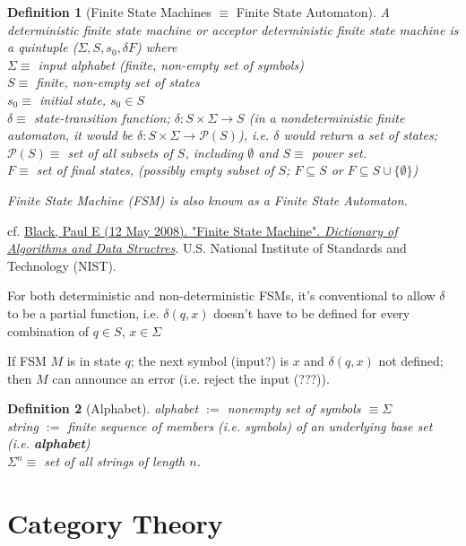 \documentclass[10pt]{amsart}
\newtheorem{definition}{Definition}
\begin{document}
\begin{multicols*}{2}
\begin{definition}[Finite State Machines $\equiv$ Finite State Automaton]
	A deterministic finite state machine or acceptor deterministic finite state machine is a quintuple ($\Sigma, S, s_0, \delta F$) where \\
	$\Sigma \equiv $ input alphabet (finite, non-empty set of symbols) \\
 	$S \equiv $ finite, non-empty set of states \\
 	$s_0 \equiv $ initial state, $s_0 \in S$ \\
 	$\delta \equiv $ state-transition function; $\delta : S \times \Sigma \to S$ (in a nondeterministic finite automaton, it would be $\delta : S \times \Sigma \to \mathcal{P}(S)$), i.e. $\delta$ would return a set of states; $\mathcal{P}(S) \equiv $ set of all subsets of $S$, including $\emptyset$ and $S \equiv$ power set. \\
 	$F \equiv $ set of final states, (possibly empty subset of $S$; $F\subseteq S$ or $F \subseteq S \cup \lbrace \emptyset \rbrace$)

	Finite State Machine (FSM) is also known as a Finite State Automaton.
\end{definition}
cf. \href{https://xlinux.nist.gov/dads/HTML/finiteStateMachine.html}{Black, Paul E (12 May 2008). "Finite State Machine". \emph{Dictionary of Algorithms and Data Structres}}. U.S. National Institute of Standards and Technology (NIST).

For both deterministic and non-deterministic FSMs, it's conventional to allow $\delta$ to be a partial function, i.e. 
$\delta(q,x)$ doesn't have to be defined for every combination of $q \in S$, $x \in \Sigma$

If FSM $M$ is in state $q$; the next symbol (input?) is $x$ and $\delta(q,x)$ not defined; then $M$ can announce an error (i.e. reject the input (???)). 


\begin{definition}[Alphabet]
	alphabet $:= $ nonempty set of symbols $\equiv \Sigma$ \\
	string $:=$ finite sequence of members (i.e. symbols) of an underlying base set (i.e. \textbf{alphabet}) \\
	$\Sigma^n \equiv $ set of all strings of length $n$.
\end{definition}

\part{Category Theory}


\end{multicols*}
\end{document}

